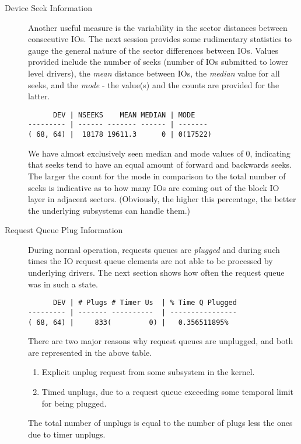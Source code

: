 \documentclass{article}
\begin{document}
\begin{description}
  \item[Device Seek Information]

  Another useful measure is the variability in the sector distances
  between consecutive IOs. The next session provides some rudimentary
  statistics to gauge the general nature of the sector differences
  between IOs. Values provided include the number of seeks (number of IOs
  submitted to lower level drivers), the \emph{mean} distance between
  IOs, the \emph{median} value for all seeks, and the \emph{mode} -
  the value(s) and the counts are provided for the latter.

\begin{verbatim}
      DEV | NSEEKS    MEAN MEDIAN | MODE
--------- | ------ ------- ------ | -------
( 68, 64) |  18178 19611.3      0 | 0(17522)
\end{verbatim}

  We have almost exclusively seen median and mode values of 0, indicating
  that seeks tend to have an equal amount of forward and backwards
  seeks. The larger the count for the mode in comparison to the total
  number of seeks is indicative as to how many IOs are coming out of
  the block IO layer in adjacent sectors. (Obviously, the higher this
  percentage, the better the underlying subsystems can handle them.)


  \item[Request Queue Plug Information]

  During normal operation, requests queues are \emph{plugged} and during
  such times the IO request queue elements are not able to be processed
  by underlying drivers. The next section shows how often the request
  queue was in such a state.

\begin{verbatim}
      DEV | # Plugs # Timer Us  | % Time Q Plugged
--------- | ------- ----------  | ----------------
( 68, 64) |     833(         0) |   0.356511895%
\end{verbatim}

  There are two major reasons why request queues are unplugged, and both
  are represented in the above table.

  \begin{enumerate}
    \item Explicit unplug request from some subsystem in the kernel.

    \item Timed unplugs, due to a request queue exceeding some temporal
    limit for being plugged. 
  \end{enumerate}

  The total number of unplugs is equal to the number of plugs less the
  ones due to timer unplugs.
\end{description}
\end{document}
